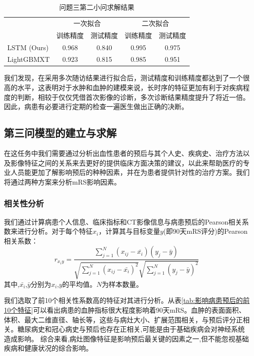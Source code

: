 \documentclass[bwprint]{gmcmthesis}
\begin{document}
\begin{table}[ht]
\centering
\caption{问题三第二小问求解结果}
\label{tab:q32}
\fontsize{11}{9}\selectfont
    \renewcommand\tabcolsep{6pt}
    {
\begin{tabular}{lcccc}
\toprule[1.2pt]
\multirow{2}{*}{} & \multicolumn{2}{c}{一次拟合} & \multicolumn{2}{c}{二次拟合} \\
                  & 训练精度        & 测试精度       & 训练精度        & 测试精度       \\ \hline
LSTM (Ours)              & 0.968       & 0.840      & 0.995       & 0.975      \\
LightGBMXT        & 0.923       & 0.815      & 0.985       & 0.951      \\ \bottomrule[1.2pt]
\end{tabular}}
\end{table}

我们发现，在采用多次随访结果进行拟合后，测试精度和训练精度都达到了一个很高的水平，这表明对于水肿和血肿的建模来说，长时序的特征更加有利于对疾病程度的判断，相较于仅仅凭借首次影像的诊断，多次诊断结果精度提升了将近一倍。因此，病患有必要进行定期的检查一遍医生做出正确的决断。

\subsection{第三问模型的建立与求解}
在这任务中我们需要通过分析出血性患者的预后与其个人史、疾病史、治疗方法以及影像特征之间的关系来去更好的提供临床方面决策的建议，以此来帮助医疗的专业人员能更加了解影响预后的种种因素，并在为患者提供针对性的治疗方案。我们将通过两种方案来分析mRS影响因素。
\subsubsection{相关性分析}
我们通过计算病患个人信息、临床指标和CT影像信息与病患预后的Pearson相关系数来进行分析。对于每个特征$x_i$，计算其与目标变量$y$(即90天mRS评分)的Pearson相关系数：
\begin{equation}
r_{x_iy} = \frac{\sum_{j=1}^{N}(x_{ij}-\bar{x_i})(y_j-\bar{y})}{\sqrt{\sum_{j=1}^{N}(x_{ij}-\bar{x_i})^2}\sqrt{\sum_{j=1}^{N}(y_j-\bar{y})^2}}
\end{equation}
其中,$\bar{x_i}$,$\bar{y}$分别为$x_i$,$y$的平均值。$N$为样本数量。

我们选取了前10个相关性系数高的特征对其进行分析。从表\ref{tab:影响病患预后的前10个特征}可以看出病患的血肿指标很大程度影响着90天mRS。血肿的表面面积、体积、最大二维直径、轴长等，这些与病灶大小、扩展范围相关，与预后评分正相关。糖尿病史和冠心病史与预后也存在正相关,可能是由于基础疾病会对神经系统造成影响。
综合来看,病灶图像特征是影响预后最关键的因素之一,但不能忽视基础疾病和健康状况的综合影响。
\end{document}
